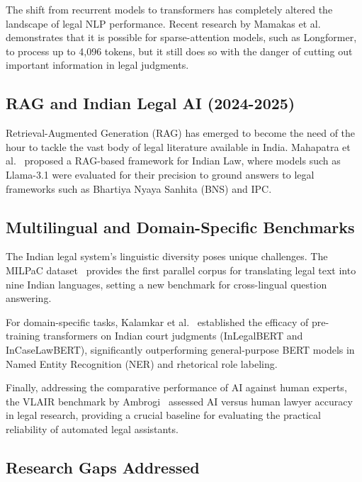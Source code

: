 \documentclass[preprint,12pt]{elsarticle}
\begin{document}
The shift from recurrent models to transformers has completely altered the landscape of legal NLP performance. Recent research by Mamakas et al.~\cite{mamakas2025processing} demonstrates that it is possible for sparse-attention models, such as Longformer, to process up to 4,096 tokens, but it still does so with the danger of cutting out important information in legal judgments.

\subsection{RAG and Indian Legal AI (2024-2025)}

Retrieval-Augmented Generation (RAG) has emerged to become the need of the hour to tackle the vast body of legal literature available in India. Mahapatra et al.~\cite{mahapatra2025redefining} proposed a RAG-based framework for Indian Law, where models such as Llama-3.1 were evaluated for their precision to ground answers to legal frameworks such as Bhartiya Nyaya Sanhita (BNS) and IPC.

\subsection{Multilingual and Domain-Specific Benchmarks}

The Indian legal system's linguistic diversity poses unique challenges. The MILPaC dataset~\cite{milpac2025} provides the first parallel corpus for translating legal text into nine Indian languages, setting a new benchmark for cross-lingual question answering. 

For domain-specific tasks, Kalamkar et al.~\cite{kalamkar2022ner} established the efficacy of pre-training transformers on Indian court judgments (InLegalBERT and InCaseLawBERT), significantly outperforming general-purpose BERT models in Named Entity Recognition (NER) and rhetorical role labeling.

Finally, addressing the comparative performance of AI against human experts, the VLAIR benchmark by Ambrogi~\cite{vlair2025} assessed AI versus human lawyer accuracy in legal research, providing a crucial baseline for evaluating the practical reliability of automated legal assistants.

\subsection{Research Gaps Addressed}
\end{document}

